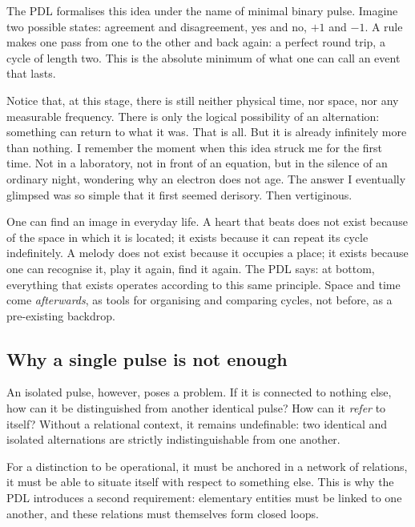 \documentclass[11pt, a4paper, openright]{book}
\begin{document}
The PDL formalises this idea under the name of minimal binary pulse. Imagine two possible states: agreement and disagreement, yes and no, $+1$ and $-1$. A rule makes one pass from one to the other and back again: a perfect round trip, a cycle of length two. This is the absolute minimum of what one can call an event that lasts.

\medskip

Notice that, at this stage, there is still neither physical time, nor space, nor any measurable frequency. There is only the logical possibility of an alternation: something can return to what it was. That is all. But it is already infinitely more than nothing. I remember the moment when this idea struck me for the first time. Not in a laboratory, not in front of an equation, but in the silence of an ordinary night, wondering why an electron does not age. The answer I eventually glimpsed was so simple that it first seemed derisory. Then vertiginous.

\medskip

One can find an image in everyday life. A heart that beats does not exist because of the space in which it is located; it exists because it can repeat its cycle indefinitely. A melody does not exist because it occupies a place; it exists because one can recognise it, play it again, find it again. The PDL says: at bottom, everything that exists operates according to this same principle. Space and time come \emph{afterwards}, as tools for organising and comparing cycles, not before, as a pre-existing backdrop.

\subsection*{Why a single pulse is not enough}

An isolated pulse, however, poses a problem. If it is connected to nothing else, how can it be distinguished from another identical pulse? How can it \emph{refer} to itself? Without a relational context, it remains undefinable: two identical and isolated alternations are strictly indistinguishable from one another.

\medskip

For a distinction to be operational, it must be anchored in a network of relations, it must be able to situate itself with respect to something else. This is why the PDL introduces a second requirement: elementary entities must be linked to one another, and these relations must themselves form closed loops.
\end{document}
